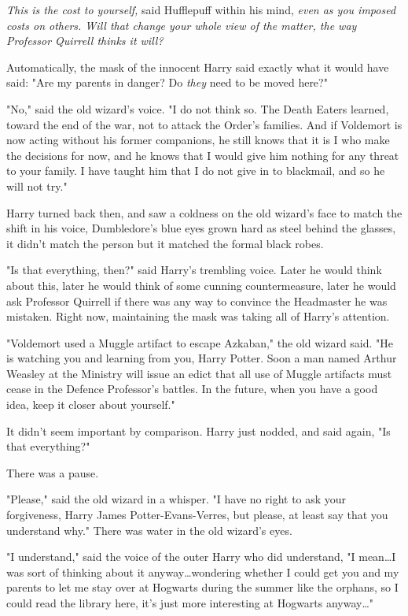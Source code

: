 \emph{This is the cost to yourself,} said Hufflepuff within his mind,
\emph{even as you imposed costs on others. Will that change your whole view of
the matter, the way Professor Quirrell thinks it will?}

Automatically, the mask of the innocent Harry said exactly what it would have
said: "Are my parents in danger? Do \emph{they} need to be moved here?"

"No," said the old wizard's voice. "I do not think so. The Death Eaters
learned, toward the end of the war, not to attack the Order's families. And if
Voldemort is now acting without his former companions, he still knows that it
is I who make the decisions for now, and he knows that I would give him nothing
for any threat to your family. I have taught him that I do not give in to
blackmail, and so he will not try."

Harry turned back then, and saw a coldness on the old wizard's face to match
the shift in his voice, Dumbledore's blue eyes grown hard as steel behind the
glasses, it didn't match the person but it matched the formal black robes.

"Is that everything, then?" said Harry's trembling voice. Later he would think
about this, later he would think of some cunning countermeasure, later he would
ask Professor Quirrell if there was any way to convince the Headmaster he was
mistaken. Right now, maintaining the mask was taking all of Harry's attention.

"Voldemort used a Muggle artifact to escape Azkaban," the old wizard said. "He
is watching you and learning from you, Harry Potter. Soon a man named Arthur
Weasley at the Ministry will issue an edict that all use of Muggle artifacts
must cease in the Defence Professor's battles. In the future, when you have a
good idea, keep it closer about yourself."

It didn't seem important by comparison. Harry just nodded, and said again, "Is
that everything?"

There was a pause.

"Please," said the old wizard in a whisper. "I have no right to ask your
forgiveness, Harry James Potter-Evans-Verres, but please, at least say that you
understand why." There was water in the old wizard's eyes.

"I understand," said the voice of the outer Harry who did understand, "I
mean…I was sort of thinking about it anyway…wondering whether I
could get you and my parents to let me stay over at Hogwarts during the summer
like the orphans, so I could read the library here, it's just more interesting
at Hogwarts anyway…"

